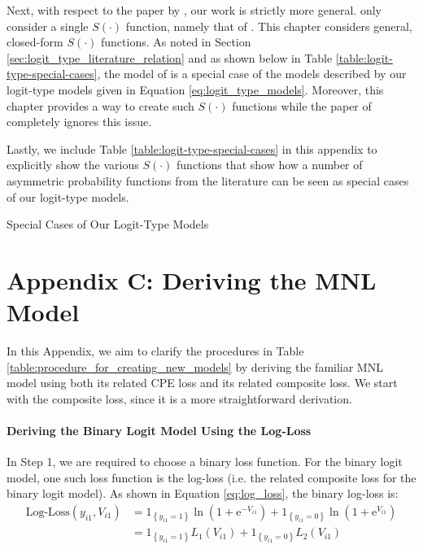 Next, with respect to the paper by \citet{das_generalized_2014}, our work is strictly more general. \citet{das_generalized_2014} only consider a single $S\left( \cdot \right)$ function, namely that of \citet{czado_parametric_1994}. This chapter considers general, closed-form $S\left( \cdot \right)$ functions. As noted in Section \ref{sec:logit_type_literature_relation} and as shown below in Table \ref{table:logit-type-special-cases}, the model of \citet{das_generalized_2014} is a special case of the models described by our logit-type models given in Equation \ref{eq:logit_type_models}. Moreover, this chapter provides a way to create such $S\left( \cdot \right)$ functions while the paper of \citet{das_generalized_2014} completely ignores this issue.

Lastly, we include Table \ref{table:logit-type-special-cases} in this appendix to explicitly show the various $S \left( \cdot \right)$ functions that show how a number of asymmetric probability functions from the literature can be seen as special cases of our logit-type models.

\begin{table}[h!]
\centering

\caption{Special Cases of Our Logit-Type Models}
\label{table:logit-type-special-cases}



\end{table}

\newpage
\section{Appendix C: Deriving the MNL Model}
\label{appendix:deriving_mnl}

In this Appendix, we aim to clarify the procedures in Table \ref{table:procedure_for_creating_new_models} by deriving the familiar MNL model using both its related CPE loss and its related composite loss. We start with the composite loss, since it is a more straightforward derivation.

\paragraph{Deriving the Binary Logit Model Using the Log-Loss}
In Step 1, we are required to choose a binary loss function. For the binary logit model, one such loss function is the log-loss (i.e. the related composite loss for the binary logit model). As shown in Equation \ref{eq:log_loss}, the binary log-loss is:
\begin{equation*}
\begin{aligned}
\textrm{Log-Loss}\left(y_{i1},  V_{i1} \right) &= 1_{\left\lbrace y_{i1} = 1 \right\rbrace} \ln \left(1 + \mathrm{e}^{-V_{i1}} \right) + 1_{\left\lbrace y_{i1} = 0 \right\rbrace} \ln \left(1 + \mathrm{e}^{ V_{i1} } \right) \\
&= 1_{\left\lbrace y_{i1} = 1 \right\rbrace} L_1 \left( V_{i1} \right) + 1_{\left\lbrace y_{i1} = 0 \right\rbrace} L_2 \left( V_{i1} \right)
\end{aligned}
\end{equation*}

